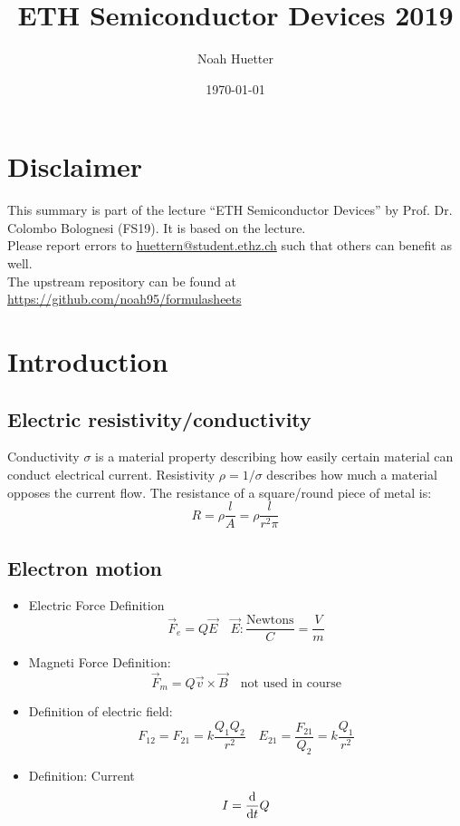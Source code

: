 \documentclass[a4paper, fontsize=8pt, landscape, DIV=1]{scrartcl}
\title{ETH Semiconductor Devices 2019}
\author{Noah Huetter}
\date{\today}
\begin{document}
\setcounter{page}{0}
\setcounter{secnumdepth}{2} %
\begin{multicols*}{4}
	\section*{Disclaimer}
	This summary is part of the lecture ``ETH Semiconductor Devices'' by Prof. Dr. Colombo Bolognesi (FS19). It is based on the lecture. \\[6pt]
	Please report errors to \href{mailto:huettern@student.ethz.ch}{huettern@student.ethz.ch} such that others can benefit as well.\\[6pt]	
  The upstream repository can be found at \href{https://github.com/noah95/formulasheets}{https://github.com/noah95/formulasheets}
	\vfill\null
	\pagebreak
  \maketitle 
  \setcounter{page}{1}
  \thispagestyle{fancy}

  \section{Introduction}
    \subsection{Electric resistivity/conductivity}
    \ifdefined\makeultracompact\else
      Conductivity $\sigma$ is a material property describing how easily certain material can conduct electrical current.
      Resistivity $\rho = 1/\sigma$ describes how much a material opposes the current flow.
      The resistance of a square/round piece of metal is:
    \fi
    \[R=\rho\frac{l}{A}=\rho\frac{l}{r^2\pi}\]

    \subsection{Electron motion}
    \begin{itemize}
      \item Electric Force Definition
        \[\vec{F}_e = Q\vec{E} \quad \vec{E}:\frac{\text{Newtons}}{C}=\frac{V}{m}\]
      \item Magneti Force Definition:
        \[\vec{F}_m = Q\vec{v}\times\vec{B} \quad \text{not used in course}\]
      \item Definition of electric field:
        \[F_{12}=F_{21}=k\frac{Q_1Q_2}{r^2} \quad E_{21}=\frac{F_21}{Q_2}=k\frac{Q_1}{r^2}\]
      \item Definition: Current
        \[I = \frac{\mathrm{d}}{\mathrm{d}t}Q\]
    \end{itemize}


\end{multicols*}
\end{document}
